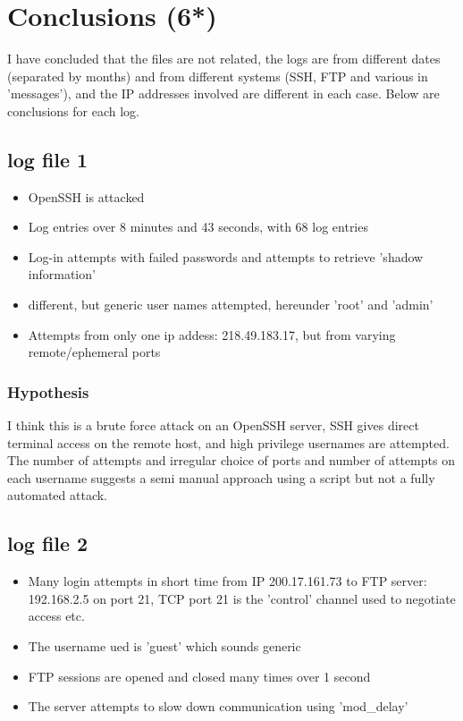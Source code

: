 \documentclass[
	letterpaper, %
	10pt, %
	unnumberedsections, %
	twoside, %
]{APAAssignment}
\begin{document}
\section{Conclusions (6*)}
I have concluded that the files are not related, the logs are from different dates (separated by months) and from different systems (SSH, FTP and various in 'messages'), and the IP addresses involved are different in each case. Below are conclusions for each log.



\subsection{log file 1}
\begin{itemize}
	\item OpenSSH is attacked
	\item Log entries over 8 minutes and 43 seconds, with 68 log entries
	\item Log-in attempts with failed passwords and attempts to retrieve 'shadow information'
	\item different, but generic user names attempted, hereunder 'root' and 'admin'
	\item Attempts from only one ip addess: 218.49.183.17, but from varying remote/ephemeral ports
\end{itemize}

\subsubsection{Hypothesis}
I think this is a brute force attack on an OpenSSH server, SSH gives direct terminal access on the remote host, and high privilege usernames are attempted. The number of attempts and irregular choice of ports and number of attempts on each username suggests a semi manual approach using a script but not a fully automated attack.


\subsection{log file 2}
\begin{itemize}
	\item Many login attempts in short time from IP 200.17.161.73 to FTP server: 192.168.2.5 on port 21, TCP port 21 is the 'control' channel used to negotiate access etc.
	\item The username ued is 'guest' which sounds generic
	\item FTP sessions are opened and closed many times over 1 second
	\item The server attempts to slow down communication using 'mod\_delay'
\end{itemize}
\end{document}
